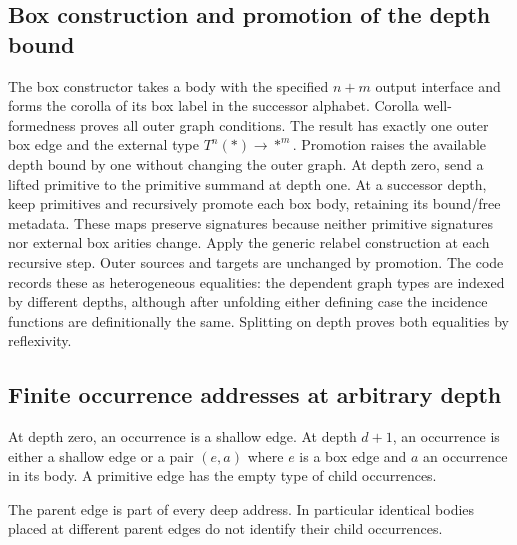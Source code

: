 \subsection{Box construction and promotion of the depth bound}
The box constructor takes a body with the specified $n+m$ output interface and
forms the corolla of its box label in the successor alphabet. Corolla
well-formedness proves all outer graph conditions. The result has exactly one
outer box edge and the external type $T^n(*)\to *^m$.
Promotion raises the available depth bound by one without changing the outer
graph. At depth zero, send a lifted primitive to the primitive summand at depth
one. At a successor depth, keep primitives and recursively promote each box
body, retaining its bound/free metadata. These maps preserve signatures because
neither primitive signatures nor external box arities change. Apply the generic
relabel construction at each recursive step.
Outer sources and targets are unchanged by promotion. The code records these
as heterogeneous equalities: the dependent graph types are indexed by different
depths, although after unfolding either defining case the incidence functions
are definitionally the same. Splitting on depth proves both equalities by
reflexivity.

\subsection{Finite occurrence addresses at arbitrary depth}
\begin{definition}\label{term:all-edges}
At depth zero, an occurrence is a shallow edge. At depth $d+1$, an occurrence is
either a shallow edge or a pair $(e,a)$ where $e$ is a box edge and $a$ an
occurrence in its body. A primitive edge has the empty type of child occurrences.
\end{definition}
The parent edge is part of every deep address. In particular identical bodies
placed at different parent edges do not identify their child occurrences.

